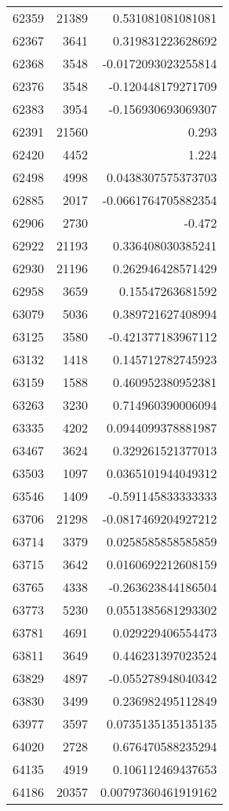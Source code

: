 \begin{tabular}{r | r | r}
62359 & 21389 & 0.531081081081081 \\
62367 & 3641 & 0.319831223628692 \\
62368 & 3548 & -0.0172093023255814 \\
62376 & 3548 & -0.120448179271709 \\
62383 & 3954 & -0.156930693069307 \\
62391 & 21560 & 0.293 \\
62420 & 4452 & 1.224 \\
62498 & 4998 & 0.0438307575373703 \\
62885 & 2017 & -0.0661764705882354 \\
62906 & 2730 & -0.472 \\
62922 & 21193 & 0.336408030385241 \\
62930 & 21196 & 0.262946428571429 \\
62958 & 3659 & 0.15547263681592 \\
63079 & 5036 & 0.389721627408994 \\
63125 & 3580 & -0.421377183967112 \\
63132 & 1418 & 0.145712782745923 \\
63159 & 1588 & 0.460952380952381 \\
63263 & 3230 & 0.714960390006094 \\
63335 & 4202 & 0.0944099378881987 \\
63467 & 3624 & 0.329261521377013 \\
63503 & 1097 & 0.0365101944049312 \\
63546 & 1409 & -0.591145833333333 \\
63706 & 21298 & -0.0817469204927212 \\
63714 & 3379 & 0.0258585858585859 \\
63715 & 3642 & 0.0160692212608159 \\
63765 & 4338 & -0.263623844186504 \\
63773 & 5230 & 0.0551385681293302 \\
63781 & 4691 & 0.029229406554473 \\
63811 & 3649 & 0.446231397023524 \\
63829 & 4897 & -0.055278948040342 \\
63830 & 3499 & 0.236982495112849 \\
63977 & 3597 & 0.0735135135135135 \\
64020 & 2728 & 0.676470588235294 \\
64135 & 4919 & 0.106112469437653 \\
64186 & 20357 & 0.00797360461919162 \\

\end{tabular}

